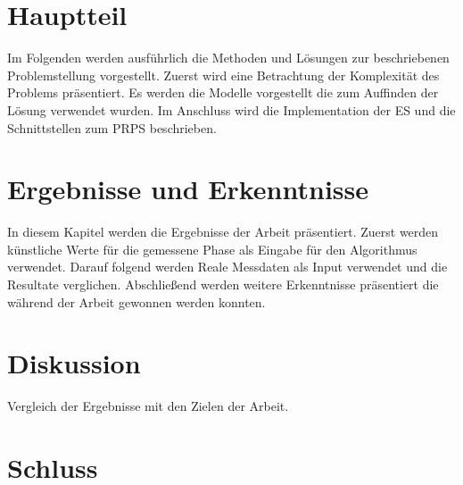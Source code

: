 \documentclass[a4paper,11pt, twoside, openright]{scrbook}
\begin{document}
\chapter{Hauptteil}
Im Folgenden werden ausführlich die Methoden und Lösungen zur beschriebenen Problemstellung vorgestellt. Zuerst wird eine Betrachtung der Komplexität des Problems präsentiert. Es werden die Modelle vorgestellt die zum Auffinden der Lösung verwendet wurden. Im Anschluss wird die Implementation der ES und die Schnittstellen zum PRPS beschrieben.
%

%
\chapter{Ergebnisse und Erkenntnisse}
In diesem Kapitel werden die Ergebnisse der Arbeit präsentiert. Zuerst werden künstliche Werte für die gemessene Phase als Eingabe für den Algorithmus verwendet. Darauf folgend werden Reale Messdaten als Input verwendet und die Resultate verglichen. Abschließend werden weitere Erkenntnisse präsentiert die während der Arbeit gewonnen werden konnten.\\
%

%
\chapter{Diskussion}
Vergleich der Ergebnisse mit den Zielen der Arbeit.\\
%
\lipsum[1-5]

%
\chapter{Schluss}
\lipsum[1-2]

%


\newpage

\nocite{*} %


\end{document}
